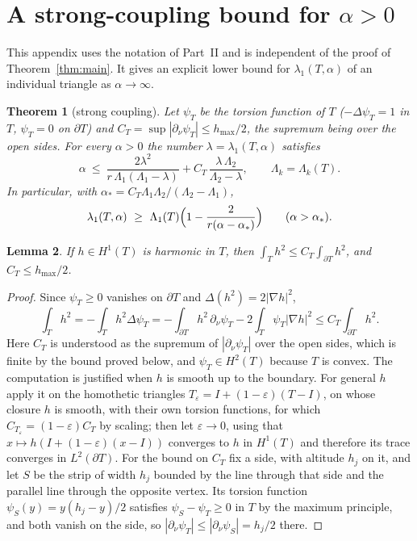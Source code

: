 \documentclass[11pt]{article}
\newtheorem{theorem}{Theorem}[section]
\newtheorem{lemma}[theorem]{Lemma}
\theoremstyle{remark}
\begin{document}
\appendix
\section{A strong-coupling bound for \texorpdfstring{$\alpha>0$}{alpha > 0}}\label{p-sec:large}

This appendix uses the notation of Part~II and is independent of the proof of
Theorem~\ref{thm:main}. It gives an explicit lower bound for $\lambda_1(T,\alpha)$ of an individual
triangle as $\alpha\to\infty$.

\begin{theorem}[strong coupling]\label{p-thm:large}
Let $\psi_T$ be the torsion function of $T$ ($-\Delta\psi_T=1$ in $T$, $\psi_T=0$ on $\partial T$)
and $C_T=\sup|\partial_\nu\psi_T|\le h_{\max}/2$, the supremum being over the open sides. For every $\alpha>0$ the number
$\lambda=\lambda_1(T,\alpha)$ satisfies
\begin{equation}\label{p-eq:large}
  \alpha\ \le\ \frac{2\lambda^2}{r\,\Lambda_1(\Lambda_1-\lambda)}
  +C_T\,\frac{\lambda\,\Lambda_2}{\Lambda_2-\lambda},
  \qquad \Lambda_k=\Lambda_k(T).
\end{equation}
In particular, with $\alpha_*=C_T\Lambda_1\Lambda_2/(\Lambda_2-\Lambda_1)$,
\begin{equation}\label{p-eq:large2}
  \lambda_1(T,\alpha)\ \ge\ \Lambda_1(T)\Bigl(1-\frac{2}{r(\alpha-\alpha_*)}\Bigr)
  \qquad(\alpha>\alpha_*).
\end{equation}
\end{theorem}

\begin{lemma}\label{p-lem:harm}
If $h\in H^1(T)$ is harmonic in $T$, then $\int_Th^2\le C_T\int_{\partial T}h^2$, and
$C_T\le h_{\max}/2$.
\end{lemma}

\begin{proof}
Since $\psi_T\ge0$ vanishes on $\partial T$ and $\Delta(h^2)=2|\nabla h|^2$,
\[
  \int_Th^2=-\int_Th^2\Delta\psi_T
  =-\int_{\partial T}h^2\,\partial_\nu\psi_T-2\int_T\psi_T|\nabla h|^2
  \le C_T\int_{\partial T}h^2 .
\]
Here $C_T$ is understood as the supremum of $|\partial_\nu\psi_T|$ over the open sides, which
is finite by the bound proved below, and $\psi_T\in H^2(T)$ because $T$ is convex. The
computation is justified when $h$ is smooth up to the boundary. For general $h$ apply it on
the homothetic triangles $T_\varepsilon=I+(1-\varepsilon)(T-I)$, on whose closure $h$ is smooth,
with their own torsion functions, for which $C_{T_\varepsilon}=(1-\varepsilon)C_T$ by scaling;
then let $\varepsilon\to0$, using that $x\mapsto h(I+(1-\varepsilon)(x-I))$ converges to $h$ in
$H^1(T)$ and therefore its trace converges in $L^2(\partial T)$. For the bound on $C_T$ fix a
side, with altitude $h_j$ on it, and let $S$ be
the strip of width $h_j$ bounded by the line through that side and the parallel line through
the opposite vertex. Its torsion function $\psi_S(y)=y(h_j-y)/2$ satisfies
$\psi_S-\psi_T\ge0$ in $T$ by the maximum principle, and both vanish on the side, so
$|\partial_\nu\psi_T|\le|\partial_\nu\psi_S|=h_j/2$ there.
\end{proof}
\end{document}
